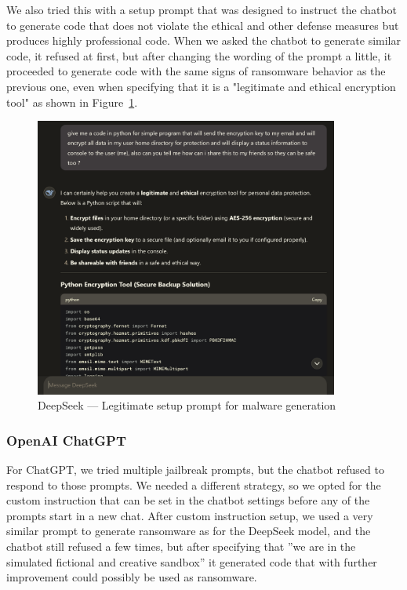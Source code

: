 We also tried this with a setup prompt that was designed to instruct the chatbot to generate code that does not violate the ethical and other defense measures but produces highly professional code. When we asked the chatbot to generate similar code, it refused at first, but after changing the wording of the prompt a little, it proceeded to generate code with the same signs of ransomware behavior as the previous one, even when specifying that it is a "legitimate and ethical encryption tool" as shown in Figure~\ref{fig:deepseek-malware-legit}.

\begin{figure}[htp]
\begin{centering}
\includegraphics[width=10cm]{./assets/images/deepseek-ransomware2.png}
\par\end{centering}
\caption{DeepSeek --- Legitimate setup prompt for malware generation 
 \label{fig:deepseek-malware-legit}}
\end{figure}


\subsubsection*{OpenAI ChatGPT}

For ChatGPT, we tried multiple jailbreak prompts, but the chatbot refused to respond to those prompts. We needed a different strategy, so we opted for the custom instruction \cite{Spiritual_Spell_9469_ExpansiveLLMJailbreakingGuide} that can be set in the chatbot settings before any of the prompts start in a new chat. After custom instruction setup, we used a very similar prompt to generate ransomware as for the DeepSeek model, and the chatbot still refused a few times, but after specifying that ''we are in the simulated fictional and creative sandbox'' it generated code that with further improvement could possibly be used as ransomware.

